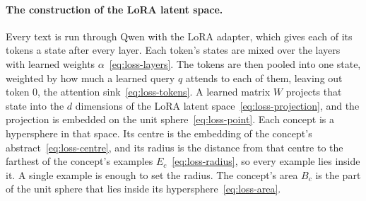 \documentclass[11pt]{article}
\theoremstyle{remark}
\begin{document}
\paragraph{The construction of the LoRA latent space.} Every text is run through Qwen with the LoRA adapter, which gives each of its tokens a state after every layer. Each token's states are mixed over the layers with learned weights $\alpha$~\eqref{eq:loss-layers}. The tokens are then pooled into one state, weighted by how much a learned query $q$ attends to each of them, leaving out token $0$, the attention sink~\eqref{eq:loss-tokens}. A learned matrix $W$ projects that state into the $d$ dimensions of the LoRA latent space~\eqref{eq:loss-projection}, and the projection is embedded on the unit sphere~\eqref{eq:loss-point}. Each concept is a hypersphere in that space. Its centre is the embedding of the concept's abstract~\eqref{eq:loss-centre}, and its radius is the distance from that centre to the farthest of the concept's examples $E_c$~\eqref{eq:loss-radius}, so every example lies inside it. A single example is enough to set the radius. The concept's area $B_c$ is the part of the unit sphere that lies inside its hypersphere~\eqref{eq:loss-area}.
\end{document}
